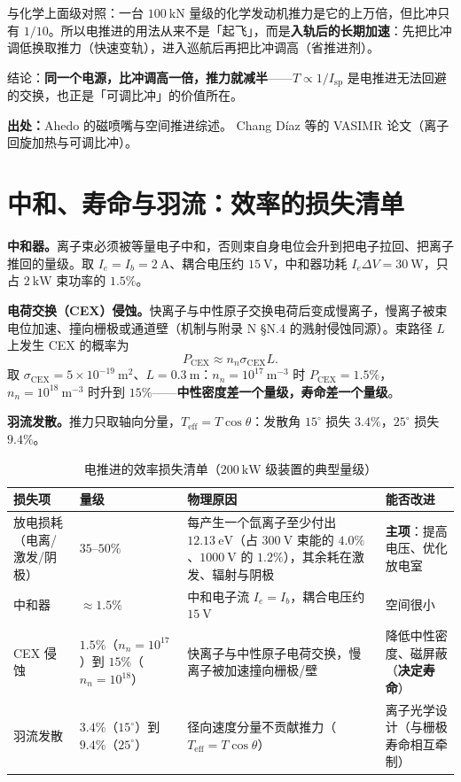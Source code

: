 与化学上面级对照：一台 $100\ \mathrm{kN}$ 量级的化学发动机推力是它的上万倍，但比冲只有 $1/10$。所以电推进的用法从来不是「起飞」，而是\textbf{入轨后的长期加速}：先把比冲调低换取推力（快速变轨），进入巡航后再把比冲调高（省推进剂）。

结论：\textbf{同一个电源，比冲调高一倍，推力就减半}——$T\propto1/I_{\mathrm{sp}}$ 是电推进无法回避的交换，也正是「可调比冲」的价值所在。

{\footnotesize
\textbf{出处：}Ahedo 的磁喷嘴与空间推进综述。
Chang D\'iaz 等的 VASIMR 论文（离子回旋加热与可调比冲）。
}


\section{中和、寿命与羽流：效率的损失清单}

\textbf{中和器。}离子束必须被等量电子中和，否则束自身电位会升到把电子拉回、把离子推回的量级。取 $I_e=I_b=2\ \mathrm{A}$、耦合电压约 $15\ \mathrm{V}$，中和器功耗 $I_e\Delta V=30\ \mathrm{W}$，只占 $2\ \mathrm{kW}$ 束功率的 $1.5\%$。

\textbf{电荷交换（CEX）侵蚀。}快离子与中性原子交换电荷后变成慢离子，慢离子被束电位加速、撞向栅极或通道壁（机制与附录 N \S N.4 的溅射侵蚀同源）。束路径 $L$ 上发生 CEX 的概率为
\begin{equation}
P_{\mathrm{CEX}}\approx n_n\sigma_{\mathrm{CEX}}L .
\label{eq:app-o-cex}
\end{equation}
取 $\sigma_{\mathrm{CEX}}=5\times10^{-19}\ \mathrm{m^2}$、$L=0.3\ \mathrm{m}$：$n_n=10^{17}\ \mathrm{m^{-3}}$ 时 $P_{\mathrm{CEX}}=1.5\%$，$n_n=10^{18}\ \mathrm{m^{-3}}$ 时升到 $15\%$——\textbf{中性密度差一个量级，寿命差一个量级}。

\textbf{羽流发散。}推力只取轴向分量，$T_{\mathrm{eff}}=T\cos\theta$：发散角 $15^\circ$ 损失 $3.4\%$，$25^\circ$ 损失 $9.4\%$。

\begin{table}[htbp]
\centering
\small
\caption{电推进的效率损失清单（$200\ \mathrm{kW}$ 级装置的典型量级）}
\label{tab:app-o-loss}
\begin{tabular}{@{}p{2.5cm}p{2.6cm}p{5.6cm}p{4.3cm}@{}}
\toprule
损失项 & 量级 & 物理原因 & 能否改进 \\
\midrule
放电损耗（电离/激发/阴极） & $35$--$50\%$ & 每产生一个氙离子至少付出 $12.13\ \mathrm{eV}$（占 $300\ \mathrm{V}$ 束能的 $4.0\%$、$1000\ \mathrm{V}$ 的 $1.2\%$），其余耗在激发、辐射与阴极 & \textbf{主项}：提高电压、优化放电室 \\
中和器 & $\approx1.5\%$ & 中和电子流 $I_e=I_b$，耦合电压约 $15\ \mathrm{V}$ & 空间很小 \\
CEX 侵蚀 & $1.5\%$（$n_n=10^{17}$）到 $15\%$（$n_n=10^{18}$） & 快离子与中性原子电荷交换，慢离子被加速撞向栅极/壁 & 降低中性密度、磁屏蔽（\textbf{决定寿命}） \\
羽流发散 & $3.4\%$（$15^\circ$）到 $9.4\%$（$25^\circ$） & 径向速度分量不贡献推力（$T_{\mathrm{eff}}=T\cos\theta$） & 离子光学设计（与栅极寿命相互牵制） \\
\bottomrule
\end{tabular}
\end{table}

